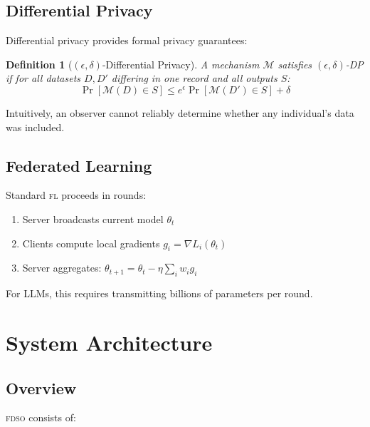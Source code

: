\documentclass[11pt,letterpaper]{article}
\newtheorem{definition}{Definition}[section]
\newcommand{\FDSO}{\textsc{fdso}}
\newcommand{\FL}{\textsc{fl}}
\begin{document}
\subsection{Differential Privacy}

Differential privacy provides formal privacy guarantees:

\begin{definition}[$(\epsilon, \delta)$-Differential Privacy]
A mechanism $\mathcal{M}$ satisfies $(\epsilon, \delta)$-DP if for all datasets $D, D'$ differing in one record and all outputs $S$:
\begin{equation}
\Pr[\mathcal{M}(D) \in S] \leq e^\epsilon \Pr[\mathcal{M}(D') \in S] + \delta
\end{equation}
\end{definition}

Intuitively, an observer cannot reliably determine whether any individual's data was included.

\subsection{Federated Learning}

Standard \FL{} proceeds in rounds:
\begin{enumerate}
    \item Server broadcasts current model $\theta_t$
    \item Clients compute local gradients $g_i = \nabla L_i(\theta_t)$
    \item Server aggregates: $\theta_{t+1} = \theta_t - \eta \sum_i w_i g_i$
\end{enumerate}

For LLMs, this requires transmitting billions of parameters per round.

\section{System Architecture}

\subsection{Overview}

\FDSO{} consists of:
\end{document}
